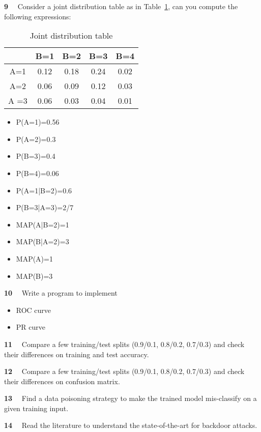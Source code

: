 \begin{newquestion}{\textbf{9}~~}
Consider a joint distribution table as in Table~\ref{tab:jointdistribution2}, can you compute the following expressions: 
\begin{table}[h!]
    \centering
    \begin{tabular}{|c|c|c|c|c|}
    \hline
         & B=1 & B=2 & B=3 & B=4 \\
         \hline
       A=1 & 0.12 & 0.18 & 0.24 & 0.02 \\ 
       A=2 & 0.06 & 0.09 & 0.12 & 0.03 \\
       A =3 & 0.06 & 0.03 & 0.04 & 0.01 \\
       \hline
    \end{tabular}
    \caption{Joint distribution table}
    \label{tab:jointdistribution2}
\end{table}
\begin{itemize}
    \item P(A=1)=0.56
    \item P(A=2)=0.3 
    \item P(B=3)=0.4
    \item P(B=4)=0.06
    \item P(A=1|B=2)=0.6 
    \item P(B=3|A=3)=2/7
    \item MAP(A|B=2)=1
    \item MAP(B|A=2)=3
    \item MAP(A)=1
    \item MAP(B)=3
\end{itemize}
\end{newquestion}

\begin{newquestion}{\textbf{10}~~}
Write a program to implement 
    \begin{itemize}
        \item ROC curve
        \item PR curve
    \end{itemize}
\end{newquestion}

\begin{newquestion}{\textbf{11}~~}
Compare a few training/test splits (0.9/0.1, 0.8/0.2, 0.7/0.3) and check their differences on training and test accuracy.
\end{newquestion}

\begin{newquestion}{\textbf{12}~~}
Compare a few training/test splits (0.9/0.1, 0.8/0.2, 0.7/0.3) and check their differences on confusion matrix. 
\end{newquestion}

\begin{newquestion}{\textbf{13}~~}
Find a data poisoning strategy to make the trained model mis-classify on a given training input.
\end{newquestion}

\begin{newquestion}{\textbf{14}~~}
Read the literature to understand the state-of-the-art for backdoor attacks. 
\end{newquestion}


